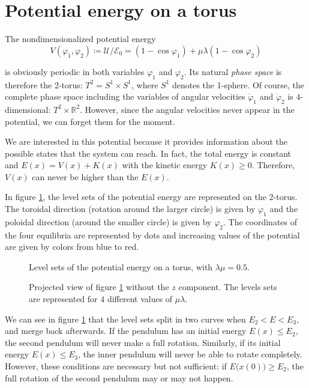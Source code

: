 \documentclass[11 pt]{article}
\begin{document}
\section{Potential energy on a torus}
The nondimensionalized potential energy 
\[V(\varphi_1, \varphi_2) \coloneqq \mathcal{U}/{\mathcal{E}_0} = (1-\cos{\varphi_1}) + \mu \lambda (1-\cos{\varphi_2})\]

is obviously periodic in both variables $\varphi_1$ and $\varphi_2$. Its natural \textit{phase space} is therefore the 2-torus: $T^2 = S^1 \times S^1$, where $S^1$ denotes the 1-sphere. Of course, the complete phase space including the variables of angular velocities $\dot \varphi_1$ and $\dot \varphi_2$ is $4$-dimensional: $T^2 \times \mathbb{R}^2$. However, since the angular velocities never appear in the potential, we can forget them for the moment.

We are interested in this potential because it provides information about the possible states that the system can reach. In fact, the total energy is constant and $E(x)=V(x)+K(x)$ with the kinetic energy $K(x) \geq 0$. Therefore, $V(x)$ can never be higher than the $E(x)$.

In figure \ref{fig:potential_3D}, the level sets of the potential energy are represented on the 2-torus. The toroidal direction (rotation around the larger circle) is given by $\varphi_1$ and the poloidal direction (around the smaller circle) is given by $\varphi_2$. The coordinates of the four equilibria are represented by dots and increasing values of the potential are given by colors from blue to red. %

\begin{figure}[H]
    \centering
    
    \vspace*{-15mm}
    \caption{Level sets of the potential energy on a torus, with $\lambda \mu = 0.5$. }
    \label{fig:potential_3D}
\end{figure}

\begin{figure}[H]
    \centering
    
    \caption{Projected view of figure \ref{fig:potential_3D} without the $z$ component. The levels sets are represented for $4$ different values of $\mu \lambda$.}
    \label{fig:potential_2D}
\end{figure}

We can see in figure \ref{fig:potential_3D} that the level sets split in two curves when $E_2<E<E_3$, and merge back afterwards. %
If the pendulum has an initial energy $E(x)\leq E_2$, the second pendulum will never make a full rotation. Similarly, if its initial energy $E(x)\leq E_3$, the inner pendulum will never be able to rotate completely. However, these conditions are necessary but not sufficient: if $E\big(x(0)\big) \geq E_2$, the full rotation of the second pendulum may or may not happen. 
\end{document}
